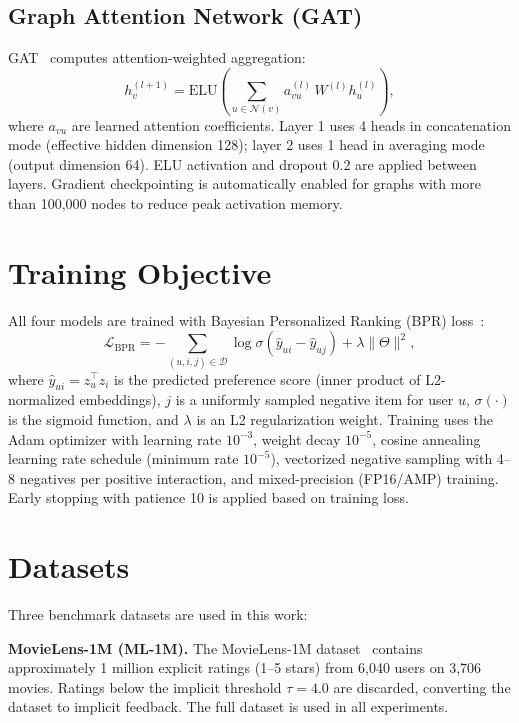 \subsection{Graph Attention Network (GAT)}

GAT~\cite{velickovic2018graph} computes attention-weighted aggregation:
\begin{equation}
    h_v^{(l+1)} = \text{ELU}\!\left(\sum_{u \in \mathcal{N}(v)} a_{vu}^{(l)}\, W^{(l)} h_u^{(l)}\right),
    \label{eq:gat}
\end{equation}
where $a_{vu}$ are learned attention coefficients. Layer 1 uses 4 heads in concatenation mode (effective hidden dimension 128); layer 2 uses 1 head in averaging mode (output dimension 64). ELU activation and dropout 0.2 are applied between layers. Gradient checkpointing is automatically enabled for graphs with more than 100,000 nodes to reduce peak activation memory.

\section{Training Objective}

All four models are trained with Bayesian Personalized Ranking (BPR) loss~\cite{rendle2009bpr}:
\begin{equation}
    \mathcal{L}_\text{BPR} = -\sum_{(u,i,j) \in \mathcal{D}} \log \sigma\!\left(\hat{y}_{ui} - \hat{y}_{uj}\right) + \lambda \|\Theta\|^2,
    \label{eq:bpr}
\end{equation}
where $\hat{y}_{ui} = z_u^\top z_i$ is the predicted preference score (inner product of L2-normalized embeddings), $j$ is a uniformly sampled negative item for user $u$, $\sigma(\cdot)$ is the sigmoid function, and $\lambda$ is an L2 regularization weight. Training uses the Adam optimizer with learning rate $10^{-3}$, weight decay $10^{-5}$, cosine annealing learning rate schedule (minimum rate $10^{-5}$), vectorized negative sampling with 4--8 negatives per positive interaction, and mixed-precision (FP16/AMP) training. Early stopping with patience 10 is applied based on training loss.

\section{Datasets}
\label{sec:datasets}

Three benchmark datasets are used in this work:

\textbf{MovieLens-1M (ML-1M).} The MovieLens-1M dataset~\cite{movielens1m} contains approximately 1 million explicit ratings (1--5 stars) from 6,040 users on 3,706 movies. Ratings below the implicit threshold $\tau = 4.0$ are discarded, converting the dataset to implicit feedback. The full dataset is used in all experiments.

